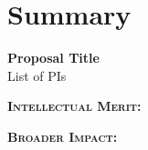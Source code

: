 
\chapter{Summary}

\savetrivseps
\zerotrivseps
\begin{center}
\textbf{Proposal Title}\\
List of PIs
\end{center}
\restoretrivseps

\textbf{\textsc{Intellectual Merit:}}

\textbf{\textsc{Broader Impact:}}

\clearpage
